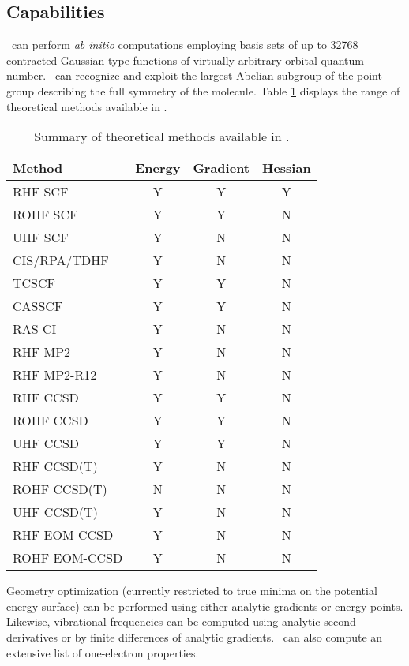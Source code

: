 \subsection{Capabilities}
\PSIthree\ can perform {\em ab initio} computations employing
basis sets of up to 32768 contracted Gaussian-type functions of
virtually arbitrary orbital quantum number.
\PSIthree\ can recognize and exploit the largest Abelian subgroup of the
point group describing the full symmetry of the molecule.
Table \ref{table:methods} displays the range of theoretical
methods available in \PSIthree .
\begin{table}
\caption{Summary of theoretical methods available in \PSIthree.} \label{table:methods}
\parsep 10pt
\begin{center}
\begin{tabular}{lccc} \hline\hline
Method        & Energy & Gradient & Hessian \\ \hline
RHF SCF       & Y & Y & Y \\
ROHF SCF      & Y & Y & N \\
UHF SCF       & Y & N & N \\
CIS/RPA/TDHF  & Y & N & N \\
TCSCF         & Y & Y & N \\
CASSCF        & Y & Y & N \\
RAS-CI        & Y & N & N \\
RHF MP2       & Y & N & N \\
RHF MP2-R12   & Y & N & N \\
RHF CCSD      & Y & Y & N \\
ROHF CCSD     & Y & Y & N \\ 
UHF CCSD      & Y & Y & N \\
RHF CCSD(T)   & Y & N & N \\
ROHF CCSD(T)  & N & N & N \\
UHF CCSD(T)   & Y & N & N \\
RHF EOM-CCSD  & Y & N & N \\
ROHF EOM-CCSD & Y & N & N \\
\hline\hline
\end{tabular}
\end{center}
\end{table}
Geometry optimization (currently restricted to true minima on the potential
energy surface) can be performed using either analytic gradients
or energy points.  Likewise, vibrational frequencies can be 
computed using analytic second derivatives or by finite
differences of analytic gradients.
\PSIthree\ can also compute an extensive list of one-electron properties.

